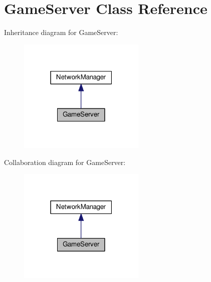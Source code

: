 \hypertarget{classGameServer}{}\section{Game\+Server Class Reference}
\label{classGameServer}


Inheritance diagram for Game\+Server\+:
\nopagebreak
\begin{figure}[H]
\begin{center}
\leavevmode
\includegraphics[width=171pt]{classGameServer__inherit__graph}
\end{center}
\end{figure}


Collaboration diagram for Game\+Server\+:
\nopagebreak
\begin{figure}[H]
\begin{center}
\leavevmode
\includegraphics[width=171pt]{classGameServer__coll__graph}
\end{center}
\end{figure}
